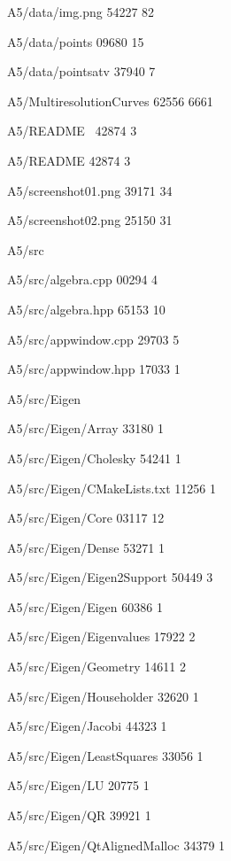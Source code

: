 \documentclass[11pt]{article}
\begin{document}
\begin{flushleft}
{A5/data/img.png                         54227    82

A5/data/points                          09680    15

A5/data/pointsatv                       37940     7

A5/MultiresolutionCurves                62556  6661

A5/README~                              42874     3

A5/README                               42874     3

A5/screenshot01.png                     39171    34

A5/screenshot02.png                     25150    31

A5/src                                  

A5/src/algebra.cpp                      00294     4

A5/src/algebra.hpp                      65153    10

A5/src/appwindow.cpp                    29703     5

A5/src/appwindow.hpp                    17033     1

A5/src/Eigen                            

A5/src/Eigen/Array                      33180     1

A5/src/Eigen/Cholesky                   54241     1

A5/src/Eigen/CMakeLists.txt             11256     1

A5/src/Eigen/Core                       03117    12

A5/src/Eigen/Dense                      53271     1

A5/src/Eigen/Eigen2Support              50449     3

A5/src/Eigen/Eigen                      60386     1

A5/src/Eigen/Eigenvalues                17922     2

A5/src/Eigen/Geometry                   14611     2

A5/src/Eigen/Householder                32620     1

A5/src/Eigen/Jacobi                     44323     1

A5/src/Eigen/LeastSquares               33056     1

A5/src/Eigen/LU                         20775     1

A5/src/Eigen/QR                         39921     1

A5/src/Eigen/QtAlignedMalloc            34379     1

}
\end{flushleft}
\end{document}
